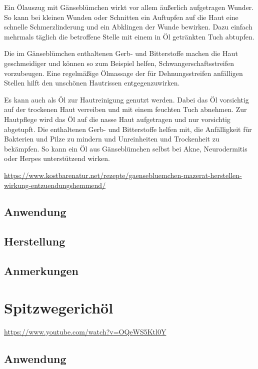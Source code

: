 Ein Ölauszug mit Gänseblümchen wirkt vor allem äußerlich aufgetragen Wunder. So kann bei kleinen Wunden oder Schnitten ein Auftupfen auf die Haut eine schnelle Schmerzlinderung und ein Abklingen der Wunde bewirken. Dazu einfach mehrmals täglich die betroffene Stelle mit einem in Öl getränkten Tuch abtupfen.

Die im Gänseblümchen enthaltenen Gerb- und Bitterstoffe machen die Haut geschmeidiger und können so zum Beispiel helfen, Schwangerschaftsstreifen vorzubeugen. Eine regelmäßige Ölmassage der für Dehnungsstreifen anfälligen Stellen hilft den unschönen Hautrissen entgegenzuwirken.

Es kann auch als Öl zur Hautreinigung genutzt werden. Dabei das Öl vorsichtig auf der trockenen Haut verreiben und mit einem feuchten Tuch abnehmen. Zur Hautpflege wird das Öl auf die nasse Haut aufgetragen und nur vorsichtig abgetupft. Die enthaltenen Gerb- und Bitterstoffe helfen mit, die Anfälligkeit für Bakterien und Pilze zu mindern und Unreinheiten und Trockenheit zu bekämpfen. So kann ein Öl aus Gänseblümchen selbst bei Akne, Neurodermitis oder Herpes unterstützend wirken.

\url{https://www.kostbarenatur.net/rezepte/gaensebluemchen-mazerat-herstellen-wirkung-entzuendungshemmend/}

\subsection{Anwendung}

\subsection{Herstellung}

\subsection{Anmerkungen}






\section{Spitzwegerichöl}


\cite{swrhandwerkskunst} 

\url{https://www.youtube.com/watch?v=OQeWS5Ktl0Y}

 

\subsection{Anwendung}

